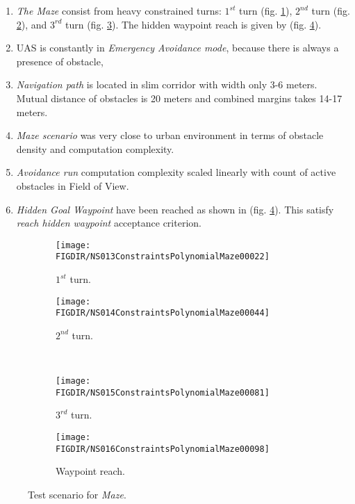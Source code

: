 \begin{enumerate}
    \item \emph{The Maze} consist from heavy constrained turns: $1^{st}$ turn (fig. \ref{fig:mazeFirstTurn}), $2^{nd}$ turn (fig. \ref{fig:mazeSecondTurn}), and $3^{rd}$ turn (fig. \ref{fig:mazeThirdTurn}). The hidden waypoint reach is given by (fig. \ref{fig:mazeWaypointReach}).
        
    \item UAS is constantly in \emph{Emergency Avoidance mode}, because there is always a presence of obstacle,
        
    \item \emph{Navigation path} is located in slim corridor with width only 3-6 meters. Mutual distance of obstacles is 20 meters and combined margins takes 14-17 meters.
        
    \item \emph{Maze scenario} was very close to urban environment in terms of obstacle density and computation complexity.
        
    \item \emph{Avoidance run} computation complexity scaled linearly with count of active obstacles in Field of View.
    
    \item \emph{Hidden Goal Waypoint} have been reached as shown in (fig. \ref{fig:mazeWaypointReach}). This satisfy \emph{reach hidden waypoint} acceptance criterion. 
\end{enumerate}


\begin{figure}[H]
    \centering
    \begin{subfigure}{0.48\textwidth}
    	\centering
        \texttt{[image: \\FIGDIR/NS013ConstraintsPolynomialMaze00022]}
        \caption{$1^{st}$ turn.}
        \label{fig:mazeFirstTurn}
    \end{subfigure}
    \begin{subfigure}{0.48\textwidth}
	    \centering
        \texttt{[image: \\FIGDIR/NS014ConstraintsPolynomialMaze00044]} 
        \caption{$2^{nd}$ turn.}
        \label{fig:mazeSecondTurn}
    \end{subfigure}
    \\
    \begin{subfigure}{0.48\textwidth}
    	\centering
        \texttt{[image: \\FIGDIR/NS015ConstraintsPolynomialMaze00081]} 
        \caption{$3^{rd}$ turn.}
        \label{fig:mazeThirdTurn}
    \end{subfigure}
    \begin{subfigure}{0.48\textwidth}
    	\centering
        \texttt{[image: \\FIGDIR/NS016ConstraintsPolynomialMaze00098]} 
        \caption{Waypoint reach.}
        \label{fig:mazeWaypointReach}
    \end{subfigure}
    \caption{Test scenario for \emph{Maze}. }
    \label{fig:testCaseMazeSolver}
\end{figure}

